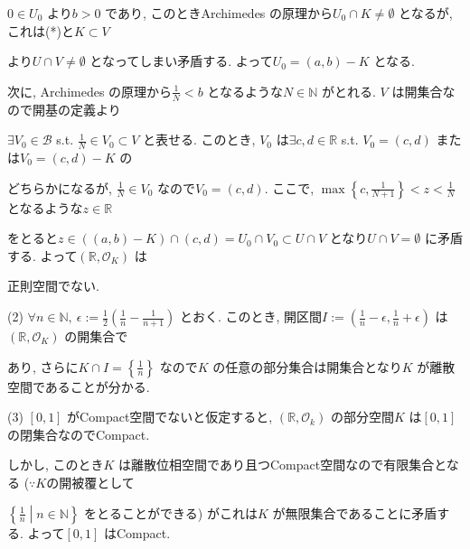 \documentclass{jsarticle}
\begin{document}
$0 \in U_0$ より$b > 0$ であり, このときArchimedes の原理から$U_0 \cap K \neq \emptyset$ となるが, これは(*)と$K \subset V$ 

より$U \cap V \neq \emptyset$ となってしまい矛盾する. よって$U_0 = (a,b) - K$ となる.

次に, Archimedes の原理から$\displaystyle \frac{1}{N} < b$ となるような$N \in \mathbb{N}$ がとれる. $V$ は開集合なので開基の定義より 

$\exists V_0 \in \mathcal{B}$ s.t. $\displaystyle \frac{1}{N} \in V_0 \subset V$ と表せる. このとき, $V_0$ は$\exists c,d \in \mathbb{R}$ s.t. $V_0 = (c,d)$ または$V_0 = (c,d) - K$ の

どちらかになるが, $\displaystyle \frac{1}{N} \in V_0$ なので$V_0 = (c,d)$. ここで, $\max\left\{c, \displaystyle \frac{1}{N+1} \right\} < z < \displaystyle \frac{1}{N}$ となるような$z \in \mathbb{R}$ 

をとると$z \in ((a,b) - K) \cap (c,d) = U_0 \cap V_0 \subset U \cap V$ となり$U \cap V = \emptyset$ に矛盾する. よって$(\mathbb{R}, \mathcal{O}_K)$ は

正則空間でない.

(2) $\forall n \in \mathbb{N}, \ \epsilon := \displaystyle \frac{1}{2} \left(\displaystyle \frac{1}{n} - \frac{1}{n+1}\right)$ とおく. このとき, 開区間$I := \left(\displaystyle \frac{1}{n} - \epsilon, \frac{1}{n} + \epsilon \right)$ は$(\mathbb{R}, \mathcal{O}_K)$ の開集合で

あり, さらに$K \cap I = \left\{\displaystyle \frac{1}{n} \right\}$ なので$K$ の任意の部分集合は開集合となり$K$ が離散空間であることが分かる.

(3) $[0,1]$ がCompact空間でないと仮定すると, $(\mathbb{R}, \mathcal{O}_k)$ の部分空間$K$ は$[0,1]$ の閉集合なのでCompact. 

しかし, このとき$K$ は離散位相空間であり且つCompact空間なので有限集合となる ($\because K$の開被覆として

$\left\{\displaystyle \frac{1}{n} \middle | n \in \mathbb{N} \right\}$ をとることができる) がこれは$K$ が無限集合であることに矛盾する. よって$[0,1]$ はCompact.
\end{document}
